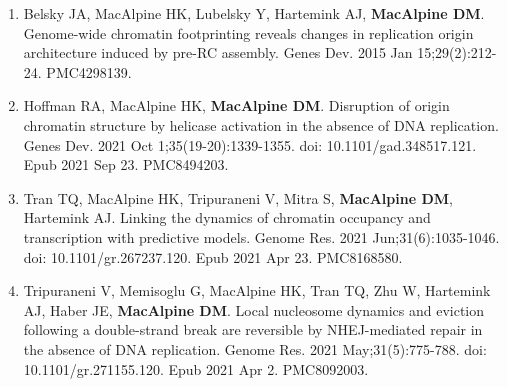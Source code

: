 \begin{enumerate}
\setlength\itemsep{0.35em}


\item Belsky JA, MacAlpine HK, Lubelsky Y, Hartemink AJ, \textbf{MacAlpine DM}. Genome-wide chromatin footprinting reveals changes in replication origin architecture induced by pre-RC assembly. Genes Dev. 2015 Jan 15;29(2):212-24. PMC4298139.

\item Hoffman RA, MacAlpine HK, \textbf{MacAlpine DM}. Disruption of origin chromatin structure by helicase activation in the absence of DNA replication. Genes Dev. 2021 Oct 1;35(19-20):1339-1355. doi: 10.1101/gad.348517.121. Epub 2021 Sep 23. PMC8494203.

\item Tran TQ, MacAlpine HK, Tripuraneni V, Mitra S, \textbf{MacAlpine DM}, Hartemink AJ. Linking the dynamics of chromatin occupancy and transcription with predictive models. Genome Res. 2021 Jun;31(6):1035-1046. doi: 10.1101/gr.267237.120. Epub 2021 Apr 23. PMC8168580.

\item Tripuraneni V, Memisoglu G, MacAlpine HK, Tran TQ, Zhu W, Hartemink AJ, Haber JE, \textbf{MacAlpine DM}. Local nucleosome dynamics and eviction following a double-strand break are reversible by NHEJ-mediated repair in the absence of DNA replication. Genome Res. 2021 May;31(5):775-788. doi: 10.1101/gr.271155.120. Epub 2021 Apr 2. PMC8092003.

\end{enumerate}
